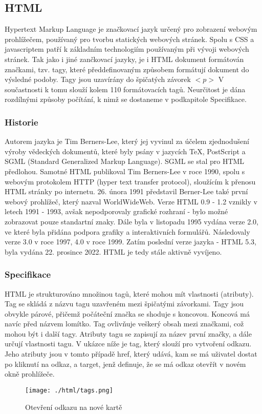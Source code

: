 \documentclass[main.tex]{subfiles}
\begin{document}
\subsection{HTML}
\label{html}
Hypertext Markup Language je značkovací jazyk určený pro zobrazení webovým prohlížečem, používaný pro tvorbu statických webových stránek. Spolu s CSS a javascriptem patří k základním technologiím používaným při vývoji webových stránek. Tak jako i jiné zančkovací jazyky, je i HTML dokument formátován značkami, tzv. tagy, které předdefinovaným způsobem formátují dokument do výsledné podoby. Tagy jsou uzavírány do špičatých závorek $<p>$ \cite{web:wik:en:html} V součastnosti k tomu slouží kolem 110 formátovacích tagů. Neurčitost je dána rozdílnými způsoby počítání, k nimž se dostaneme v podkapitole Specifikace. \cite{web:en:countinghtml}


\subsubsection{Historie}
Autorem jazyka je Tim Berners-Lee, který jej vyvinul za účelem zjednodušení výroby vědeckých dokumentů, které byly psány v jazycích TeX, PostScript a SGML (Standard Generalized Markup Language). SGML se stal pro HTML předlohou. Samotné HTML publikoval Tim Berners-Lee v roce 1990, spolu s webovým protokolem HTTP (hyper text transfer protocol), sloužícím k přenosu HTML stránky po internetu. 26. února 1991 představil Berner-Lee také první webový prohlížeč, který nazval WorldWideWeb.
Verze HTML 0.9 - 1.2 vznikly v letech 1991 - 1993, avšak nepodporovaly grafické rozhraní - bylo možné zobrazovat pouze standartní znaky. Dále byla v listopadu 1995 vydána verze 2.0, ve které byla přidána podpora grafiky a interaktivních formulářů. Následovaly verze 3.0 v roce 1997, 4.0 v roce 1999. Zatím poslední verze jazyka - HTML 5.3, byla vydána 22. prosince 2022. HTML je tedy stále aktivně vyvíjeno. \cite{web:wik:en:html}


\subsubsection{Specifikace}
HTML je strukturováno množinou tagů, které mohou mít vlastnosti (atributy). Tag se skládá z názvu tagu uzavřeném mezi špičatými závorkami. Tagy jsou obvykle párové, přičemž počáteční značka se shoduje s koncovou. Koncová má navíc před názvem lomítko. Tag ovlivňuje veškerý obsah mezi značkami, což mohou být i další tagy. Atributy tagu se zapisují za název první značky, a dále určují vlastnosti tagu. V ukázce níže je tag, který slouží pro vytvoření odkazu. Jeho atributy jsou v tomto případě href, který udává, kam se má uživatel dostat po kliknutí na odkaz, a target, jenž definuje, že se má odkaz otevřít v novém okně prohlížeče.\cite{web:wik:en:html}
		\begin{figure}[h]
			\centering
			\texttt{[image: ./html/tags.png]}
			\caption{Otevření odkazu na nové kartě}
		\end{figure}
\end{document}
